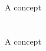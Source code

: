 \documentclass{beamer}
\begin{document}
\section[Section 1]{}

\begin{frame}{A concept}


\end{frame}




\section[Section 2]{}


\begin{frame}{A concept}

\end{frame}
\end{document}
